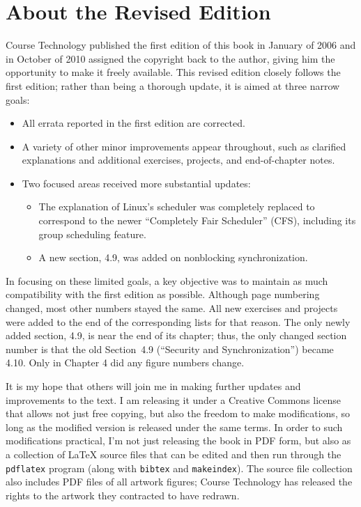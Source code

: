 \section*{About the Revised Edition}
Course Technology published the first edition of this book in January of 2006
and in October of 2010 assigned the copyright back to the author, giving him
the opportunity to make it freely available.  This revised edition closely follows
the first edition; rather than being a thorough update, it is aimed at three narrow goals:
\begin{itemize}
\item All errata reported in the first edition are corrected.
\item A variety of other minor improvements appear throughout, such as clarified explanations and additional exercises, projects, and end-of-chapter notes.
\item Two focused areas received more substantial updates:
\begin{itemize}
\item The explanation of Linux's scheduler was completely replaced to correspond to the newer ``Completely Fair Scheduler'' (CFS), including its group scheduling feature.
\item A new section, 4.9, was added on nonblocking synchronization.
\end{itemize}
\end{itemize}

In focusing on these limited goals, a key objective was to maintain as much compatibility with the first edition as possible.  Although page numbering changed, most other numbers stayed the same.  All new exercises and projects were added to the end of the corresponding lists for that reason.  The only newly added section, 4.9, is near the end of its chapter; thus, the only changed section number is that the old Section~4.9 (``Security and Synchronization'') became 4.10.  Only in Chapter 4 did any figure numbers change.

It is my hope that others will join me in making further updates and improvements to the text.  I am releasing it under a Creative Commons license that allows not just free copying, but also the freedom to make modifications, so long as the modified version is released under the same terms.  In order to such modifications practical, I'm not just releasing the book in PDF form, but also as a collection of LaTeX source files that can be edited and then run through the \texttt{pdflatex} program (along with \texttt{bibtex} and \texttt{makeindex}).  The source file collection also includes PDF files of all artwork figures; Course Technology has released the rights to the artwork they contracted to have redrawn.

